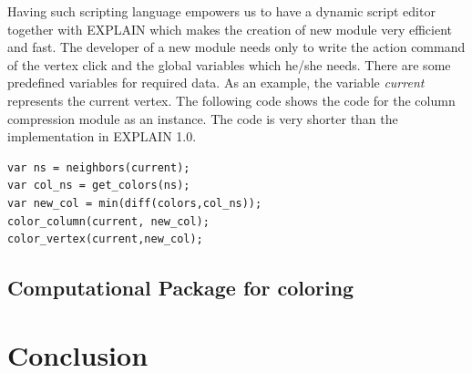 \documentclass[12pt, oneside]{book}
\begin{document}
Having such scripting language empowers us to have a dynamic script editor 
together with EXPLAIN which makes the creation of new module very efficient and fast.
The developer of a new module needs only to write the action command of the vertex
click and the global variables which he/she needs.
There are some predefined variables for required data.
As an example, the variable \textit{current} represents the current vertex.
The following code shows the code for the column compression 
module as an instance. The code is very shorter than the implementation in EXPLAIN 1.0.
\begin{lstlisting}
var ns = neighbors(current);
var col_ns = get_colors(ns);
var new_col = min(diff(colors,col_ns));
color_column(current, new_col);
color_vertex(current,new_col);
\end{lstlisting}

\section{Computational Package for coloring}
\label{s.impl.graphtea}
\chapter{Conclusion}
\label{conc}


\end{document}
